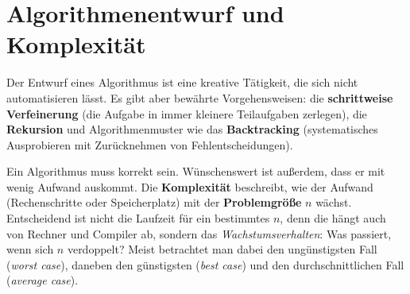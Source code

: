 \section{Algorithmenentwurf und Komplexität}\label{sec:komplexitaet}
\worum
Der Entwurf eines Algorithmus ist eine kreative Tätigkeit, die sich nicht automatisieren lässt. Es gibt aber bewährte Vorgehensweisen: die \textbf{schrittweise Verfeinerung} (die Aufgabe in immer kleinere Teilaufgaben zerlegen), die \textbf{Rekursion} und Algorithmenmuster wie das \textbf{Backtracking} (systematisches Ausprobieren mit Zurücknehmen von Fehlentscheidungen).

Ein Algorithmus muss korrekt sein. Wünschenswert ist außerdem, dass er mit wenig Aufwand auskommt. Die \textbf{Komplexität} beschreibt, wie der Aufwand (Rechenschritte oder Speicherplatz) mit der \textbf{Problemgröße} $n$ wächst. Entscheidend ist nicht die Laufzeit für ein bestimmtes $n$, denn die hängt auch von Rechner und Compiler ab, sondern das \emph{Wachstumsverhalten}: Was passiert, wenn sich $n$ verdoppelt? Meist betrachtet man dabei den ungünstigsten Fall (\emph{worst case}), daneben den günstigsten (\emph{best case}) und den durchschnittlichen Fall (\emph{average case}).

